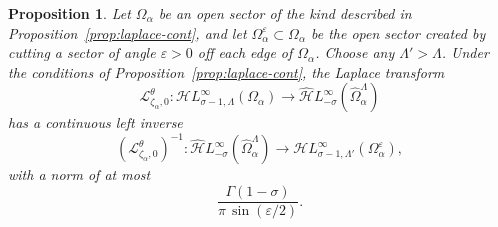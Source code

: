 \documentclass{article}
\newcommand{\singexp}[2]{\mathcal{H}L^\infty_{#1, #2}}
\newcommand{\dualsingexp}[1]{\widehat{\mathcal{H}}L^\infty_{#1}}
\newcommand{\maps}{\colon}
\newcommand{\laplace}{\mathcal{L}}
\theoremstyle{definition}
\theoremstyle{plain}
\newtheorem{prop}[definition]{Proposition}
\begin{document}
\begin{prop}\label{prop:inverse_laplace_analytic}
Let $\Omega_\alpha$ be an open sector of the kind described in Proposition~\ref{prop:laplace-cont}, and let $\Omega_\alpha^\varepsilon \subset \Omega_\alpha$ be the open sector created by cutting a sector of angle $\varepsilon > 0$ off each edge of $\Omega_\alpha$. Choose any $\Lambda' > \Lambda$. Under the conditions of Proposition~\ref{prop:laplace-cont}, the Laplace transform
\[ \laplace_{\zeta_\alpha, 0}^\theta \maps \singexp{\sigma-1}{\Lambda}(\Omega_\alpha) \to \dualsingexp{-\sigma}(\widehat{\Omega}_\alpha^\Lambda) \]
has a continuous left inverse
\[ \left(\laplace_{\zeta_\alpha, 0}^\theta\right)^{-1} \maps \dualsingexp{-\sigma}(\widehat{\Omega}_\alpha^\Lambda) \to \singexp{\sigma-1}{\Lambda'}(\Omega_\alpha^\varepsilon), \]
with a norm of at most
\[ \frac{\Gamma(1-\sigma)}{\pi\,\sin(\varepsilon/2)}. \]
\end{prop}
\end{document}
